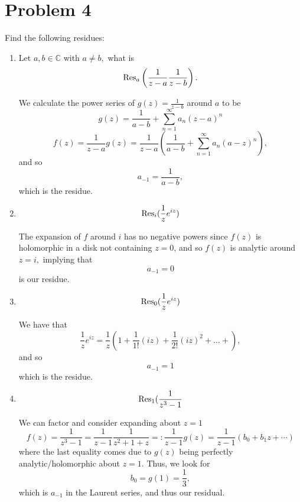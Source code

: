 \documentclass[11pt]{article}
\newcommand{\bbC}{\mathbb{C}}
\begin{document}
\section*{Problem 4}
\begin{problem}
    Find the following residues:
    \begin{enumerate}
        \item Let $a,b \in \bbC$ with $a\neq b,$ what is 
        \[\Res_a \left(\frac{1}{z - a}\frac{1}{z-b}\right).\]
        \begin{solution}
We calculate the power series of $g(z ) = \frac{1}{z-b}$ around $a$ to be 
\[g(z) = \frac{1}{a-b} + \sum_{n=1}^\infty a_n(z-a)^n\]
\[f(z) = \frac{1}{z-a} g(z) = \frac{1}{z-a}\left(\frac{1}{a-b} + \sum_{n=1}^\infty a_n(a - z)^n\right),\] and so 
\[a_{-1} = \boxed{\frac{1}{a-b}},\] which is the residue.
\end{solution}
\item 
\[\Res_i (\frac{1}{z}e^{iz})\]
\begin{solution}
The expansion of $f$ around $i$ has no negative powers since $f(z)$ is holomorphic in a disk not containing $z=  0$, and so $f(z)$ is analytic around $z = i,$ implying that \[a_{-1} = \boxed{0}\] is our residue.
\end{solution}
\item 
\[\Res_0 (\frac{1}{z}e^{iz})\]
\begin{solution}
    We have that 
    \[\frac{1}{z}e^{iz} = \frac{1}{z}(1 + \frac{1}{1!} (iz)+ \frac{1}{2!}(iz)^2 + \dots + ),\] and so 
    \[a_{-1} = \boxed{1}\] which is the residue. 
    \end{solution}
    \item 
\[\Res_1 (\frac{1}{z^3 - 1}\]
\begin{solution}
We can factor and consider expanding about $z = 1$ 
\[f(z) = \frac{1}{z^3 - 1} = \frac{1}{z-1}\frac{1}{z^2 + 1 + z} =: \frac{1}{z-1}g(z)= \frac{1}{z-1}(b_0 + b_1 z + \cdots )\] where the last equality comes due to $g(z)$ being perfectly analytic/holomorphic about $z = 1.$ Thus, we look for \[b_0 = g(1)= \boxed{\frac{1}{3}},\] which is $a_{-1}$ in the Laurent series, and thus our residual. 
\end{solution}

    \end{enumerate}
\end{problem}

\newpage
\end{document}
